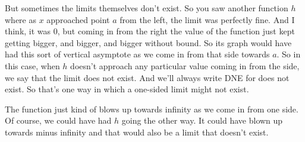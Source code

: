 \documentclass[pdftex, brazil, 12pt, twoside]{article}
\begin{document}
But sometimes the limits themselves don't exist.
So you saw another function $h$ where
as $x$ approached point $a$ from the left,
the limit was perfectly fine.
And I think, it was 0, but coming in from the right
the value of the function just kept
getting bigger, and bigger, and bigger without bound.
So its graph would have had this sort of vertical asymptote
as we come in from that side towards $a$.
So in this case, when $h$ doesn't approach any particular value
coming in from the side, we say that the limit does not exist.
And we'll always write DNE for does not exist.
So that's one way in which a one-sided limit might not
exist.

\begin{figure}[H]
  \begin{center}
  \end{center}
\end{figure}

The function just kind of blows up towards infinity as we
come in from one side.
Of course, we could have had $h$ going the other way.
It could have blown up towards minus infinity
and that would also be a limit that doesn't exist.

\begin{figure}[H]
  \begin{center}
  \end{center}
\end{figure}
\end{document}
